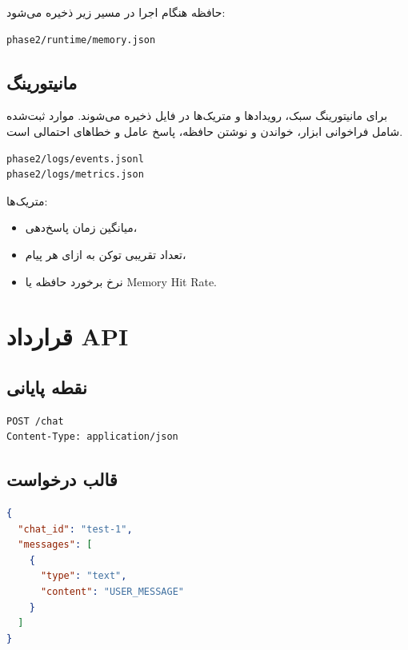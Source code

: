 \documentclass[12pt,a4paper]{article}
\begin{document}
حافظه هنگام اجرا در مسیر زیر ذخیره می‌شود:

\begin{latin}
\begin{lstlisting}
phase2/runtime/memory.json
\end{lstlisting}
\end{latin}

\subsection{مانیتورینگ}

برای مانیتورینگ سبک، رویدادها و متریک‌ها در فایل ذخیره می‌شوند. موارد ثبت‌شده شامل فراخوانی ابزار، خواندن و نوشتن حافظه، پاسخ عامل و خطاهای احتمالی است.

\begin{latin}
\begin{lstlisting}
phase2/logs/events.jsonl
phase2/logs/metrics.json
\end{lstlisting}
\end{latin}

متریک‌ها:

\begin{itemize}[noitemsep]
  \item میانگین زمان پاسخ‌دهی،
  \item تعداد تقریبی توکن به ازای هر پیام،
  \item نرخ برخورد حافظه یا Memory Hit Rate.
\end{itemize}

\section{قرارداد API}

\subsection{نقطه پایانی}

\begin{latin}
\begin{lstlisting}
POST /chat
Content-Type: application/json
\end{lstlisting}
\end{latin}

\subsection{قالب درخواست}

\begin{latin}
\begin{lstlisting}[language=json]
{
  "chat_id": "test-1",
  "messages": [
    {
      "type": "text",
      "content": "USER_MESSAGE"
    }
  ]
}
\end{lstlisting}
\end{latin}
\end{document}

